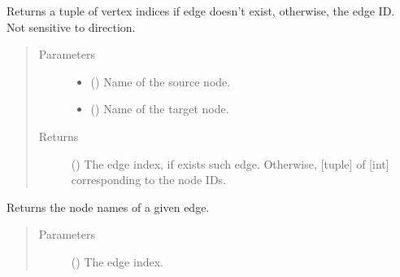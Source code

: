 \documentclass[letterpaper,10pt,english]{sphinxmanual}
\begin{document}
\begin{fulllineitems}
\begin{fulllineitems}
\label{\detokenize{reference:pypath.main.PyPath.edge_exists}}
Returns a tuple of vertex indices if edge doesn’t exist,
otherwise, the edge ID. Not sensitive to direction.
\begin{quote}\begin{description}
\item[{Parameters}] \leavevmode\begin{itemize}
\item {} 
 () \textendash{} Name of the source node.

\item {} 
 () \textendash{} Name of the target node.

\end{itemize}

\item[{Returns}] \leavevmode
() \textendash{} The edge index, if exists such edge. Otherwise,
{[}tuple{]} of {[}int{]} corresponding to the node IDs.

\end{description}\end{quote}

\end{fulllineitems}


\begin{fulllineitems}
\label{\detokenize{reference:pypath.main.PyPath.edge_loc}}
\end{fulllineitems}


\begin{fulllineitems}
\label{\detokenize{reference:pypath.main.PyPath.edge_names}}
Returns the node names of a given edge.
\begin{quote}\begin{description}
\item[{Parameters}] \leavevmode
{} () \textendash{} The edge index.


\end{description}
\end{quote}
\end{fulllineitems}
\end{fulllineitems}
\end{document}
